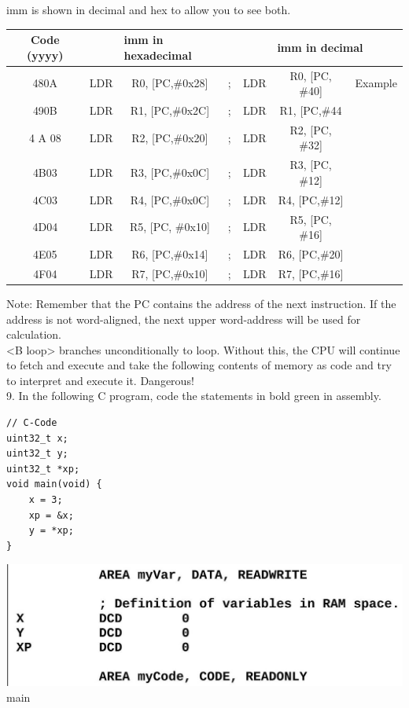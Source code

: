 \documentclass[10pt]{article}
\begin{document}
imm is shown in decimal and hex to allow you to see both.

\begin{center}
\begin{tabular}{|c|c|c|c|c|c|c|}
\hline
Code (yyyy) &  & \multicolumn{2}{|l|}{imm in hexadecimal} & \multicolumn{3}{|c|}{imm in decimal} \\
\hline
480A & LDR & R0, [PC,\#0x28] & ; & LDR & R0, [PC, \#40] & Example \\
\hline
490B & LDR & R1, [PC,\#0x2C] & ; & LDR & R1, [PC,\#44 &  \\
\hline
4 A 08 & LDR & R2, [PC,\#0x20] & ; & LDR & R2, [PC, \#32] &  \\
\hline
4B03 & LDR & R3, [PC,\#0x0C] & ; & LDR & R3, [PC, \#12] &  \\
\hline
$4 \mathrm{C03}$ & LDR & R4, [PC,\#0x0C] & ; & LDR & R4, [PC,\#12] &  \\
\hline
4D04 & LDR & R5, [PC, \#0x10] & ; & LDR & R5, [PC, \#16] &  \\
\hline
4E05 & LDR & R6, [PC,\#0x14] & ; & LDR & R6, [PC,\#20] &  \\
\hline
4F04 & LDR & R7, [PC,\#0x10] & ; & LDR & R7, [PC,\#16] &  \\
\hline
\end{tabular}
\end{center}

Note: Remember that the PC contains the address of the next instruction. If the address is not word-aligned, the next upper word-address will be used for calculation.\\
<B loop> branches unconditionally to loop. Without this, the CPU will continue to fetch and execute and take the following contents of memory as code and try to interpret and execute it. Dangerous!\\
9. In the following C program, code the statements in bold green in assembly.

\begin{verbatim}
// C-Code
uint32_t x;
uint32_t y;
uint32_t *xp;
void main(void) {
    x = 3;
    xp = &x;
    y = *xp;
}
\end{verbatim}

\includegraphics[max width=\textwidth, center]{2025_01_02_eeffad754b73de6041b6g-05}\\
main
\end{document}
